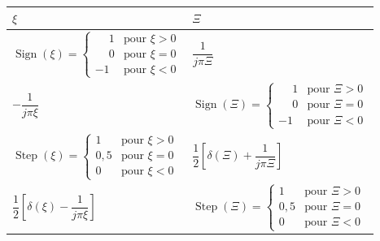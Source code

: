 \begin{table}[h!]
  \centering
  \begin{tabularx}{\textwidth}{>{\centering\arraybackslash}X >{\centering\arraybackslash}X}
    \toprule
    $\xi$ & $\Xi$ \\
    \midrule
    $\operatorname{Sign}(\xi)=
      \begin{cases}
        \phantom{-}1 & \text{pour } \xi>0\\
        \phantom{-}0 & \text{pour } \xi=0\\
        -1 & \text{pour } \xi<0
      \end{cases}$
    & $\dfrac{1}{j\pi\Xi}$ \\[16pt]
    $-\dfrac{1}{j\pi\xi}$
    & $\operatorname{Sign}(\Xi)=
      \begin{cases}
        \phantom{-}1 & \text{pour } \Xi>0\\
        \phantom{-}0 & \text{pour } \Xi=0\\
        -1 & \text{pour } \Xi<0
      \end{cases}$ \\[16pt]
    $\operatorname{Step}(\xi)=
      \begin{cases}
        1 & \text{pour } \xi>0\\
        0{,}5 & \text{pour } \xi=0\\
        0 & \text{pour } \xi<0
      \end{cases}$
    & $\dfrac{1}{2}\left[\delta(\Xi)+\dfrac{1}{j\pi\Xi}\right]$ \\[16pt]
    $\dfrac{1}{2}\left[\delta(\xi)-\dfrac{1}{j\pi\xi}\right]$
    & $\operatorname{Step}(\Xi)=
      \begin{cases}
        1 & \text{pour } \Xi>0\\
        0{,}5 & \text{pour } \Xi=0\\
        0 & \text{pour } \Xi<0
      \end{cases}$ \\
    \bottomrule
  \end{tabularx}
\end{table}

